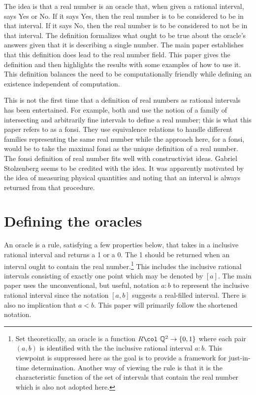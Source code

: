 \documentclass[12pt]{article}
\theoremstyle{remark}
\begin{document}
The idea is that a real number is an oracle that, when given a rational interval, says Yes or No. If it says Yes, then the real number is to be considered to be in that interval. If it says No, then the real number is to be considered to not be in that interval. The definition formalizes what ought to be true about the oracle's answers given that it is describing a single number. The main paper establishes that this definition does lead to the real number field. This paper gives the definition and then highlights the results with some examples of how to use it. This definition balances the need to be computationally friendly while defining an existence independent of computation. 

This is not the first time that a definition of real numbers as rational intervals has been entertained. For example, both \cite{bridger} and \cite{bridges} use the notion of a family of intersecting and arbitrarily fine intervals to define a real number; this is what this paper refers to as a fonsi. They use equivalence relations to handle different families representing the same real number while the approach here, for a fonsi, would be to take the maximal fonsi as the unique definition of a real number. The fonsi definition of real number fits well with constructivist ideas. Gabriel Stolzenberg seems to be credited with the idea. It was apparently motivated by the idea of measuring physical quantities and noting that an interval is always returned from that procedure. 

\section{Defining the oracles}\label{sec:ora}

An oracle is a rule, satisfying a few properties below, that takes in a inclusive rational interval and returns a 1 or a 0. The 1 should be returned when an interval ought to contain the real number.\footnote{Set theoretically, an oracle is a function $R \col \ \mathbb{Q}^2 \to \{0,1\}$ where each pair $(a,b)$ is identified with the  the inclusive rational interval $a:b$. This viewpoint is suppressed here as the goal is to provide a framework for just-in-time determination. Another way of viewing the rule is that it is the characteristic function of the set of intervals that contain the real number which is also not adopted here.} This includes the inclusive rational intervals consisting of exactly one point which may be denoted by $[a]$. The main paper uses the unconventional, but useful, notation $a:b$ to represent the inclusive rational interval since the notation $[a,b]$ suggests a real-filled interval. There is also no implication that $a < b$.  This paper will primarily follow the shortened notation. 
\end{document}
